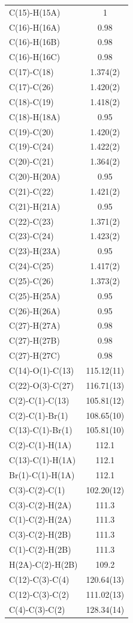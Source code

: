 \begin{center}
{\begin{supertabular}{p{1.5in}c}
C(15)-H(15A) &1\\
C(16)-H(16A) &0.98\\
C(16)-H(16B) &0.98\\
C(16)-H(16C) &0.98\\
C(17)-C(18) &1.374(2)\\
C(17)-C(26) &1.420(2)\\
C(18)-C(19) &1.418(2)\\
C(18)-H(18A) &0.95\\
C(19)-C(20) &1.420(2)\\
C(19)-C(24) &1.422(2)\\
C(20)-C(21) &1.364(2)\\
C(20)-H(20A) &0.95\\
C(21)-C(22) &1.421(2)\\
C(21)-H(21A) &0.95\\
C(22)-C(23) &1.371(2)\\
C(23)-C(24) &1.423(2)\\
C(23)-H(23A) &0.95\\
C(24)-C(25) &1.417(2)\\
C(25)-C(26) &1.373(2)\\
C(25)-H(25A) &0.95\\
C(26)-H(26A) &0.95\\
C(27)-H(27A) &0.98\\
C(27)-H(27B) &0.98\\
C(27)-H(27C) &0.98\\
C(14)-O(1)-C(13)&115.12(11)\\
C(22)-O(3)-C(27)&116.71(13)\\
C(2)-C(1)-C(13)&105.81(12)\\
C(2)-C(1)-Br(1)&108.65(10)\\
C(13)-C(1)-Br(1)&105.81(10)\\
C(2)-C(1)-H(1A)&112.1\\
C(13)-C(1)-H(1A)&112.1\\
Br(1)-C(1)-H(1A)&112.1\\
C(3)-C(2)-C(1)&102.20(12)\\
C(3)-C(2)-H(2A)&111.3\\
C(1)-C(2)-H(2A)&111.3\\
C(3)-C(2)-H(2B)&111.3\\
C(1)-C(2)-H(2B)&111.3\\
H(2A)-C(2)-H(2B)&109.2\\
C(12)-C(3)-C(4)&120.64(13)\\
C(12)-C(3)-C(2)&111.02(13)\\
C(4)-C(3)-C(2)&128.34(14)\\

\end{supertabular}}
\end{center}
